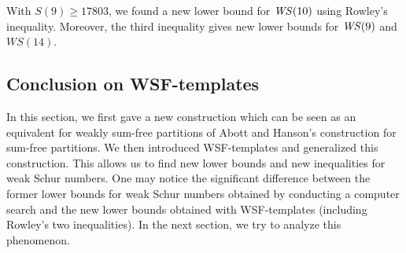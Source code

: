With \( S(9) \geqslant 17803 \), we found a new lower bound for \(\mathit{WS}(10)\) using Rowley's inequality.
Moreover, the third inequality gives new lower bounds for \(\mathit{WS}(9)\) and \(WS(14)\).


\subsection{Conclusion on WSF-templates}

\qquad In this section, we first gave a new construction which can be seen as an equivalent for weakly sum-free partitions of Abott
and Hanson's construction for sum-free partitions. We then  introduced WSF-templates and generalized this construction. This
allows us to find new lower bounds and new inequalities for weak Schur numbers. One may notice the significant difference
between the former lower bounds for weak Schur numbers obtained by conducting a computer search and the new lower bounds
obtained with WSF-templates (including Rowley's two inequalities). In the next section, we try to analyze this phenomenon.
